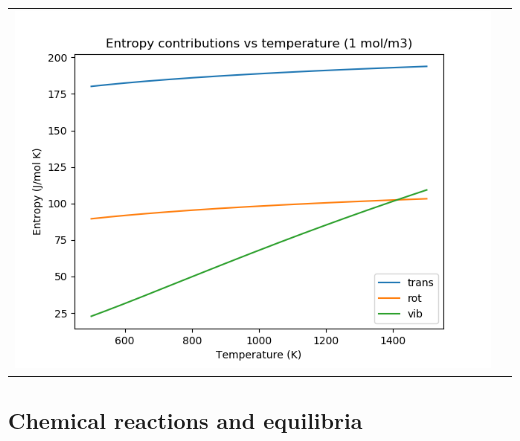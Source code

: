 \documentclass[11pt]{article}
\begin{document}
\begin{table}
\begin{tabular}{cc}
\includegraphics[scale=0.5]{./Images/ethane-entropy.png}
\end{tabular}
\end{table}

\subsection{Chemical reactions and equilibria}
\label{sec:org88a4e40}
\end{document}
